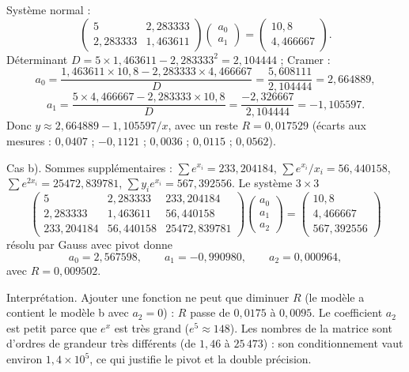  Système normal :
\[
  \begin{pmatrix} 5 & 2{,}283333\\ 2{,}283333 & 1{,}463611 \end{pmatrix}
  \begin{pmatrix} a_0\\ a_1 \end{pmatrix}
  = \begin{pmatrix} 10{,}8\\ 4{,}466667 \end{pmatrix}.
\]
Déterminant $D = 5 \times 1{,}463611 - 2{,}283333^2 = 2{,}104444$ ; Cramer :
\[
  a_0 = \frac{1{,}463611 \times 10{,}8 - 2{,}283333 \times 4{,}466667}{D}
      = \frac{5{,}608111}{2{,}104444} = 2{,}664889,
\]
\[
  a_1 = \frac{5 \times 4{,}466667 - 2{,}283333 \times 10{,}8}{D}
      = \frac{-2{,}326667}{2{,}104444} = -1{,}105597 .
\]
Donc $y \approx 2{,}664889 - 1{,}105597/x$, avec un reste $R = 0{,}017529$
(écarts aux mesures : $0{,}0407$ ; $-0{,}1121$ ; $0{,}0036$ ; $0{,}0115$ ;
$0{,}0562$).

 Cas b). Sommes supplémentaires :
$\sum e^{x_i} = 233{,}204184$, $\sum e^{x_i}/x_i = 56{,}440158$,
$\sum e^{2x_i} = 25472{,}839781$, $\sum y_ie^{x_i} = 567{,}392556$. Le système
$3\times 3$
\[
  \begin{pmatrix}
    5 & 2{,}283333 & 233{,}204184\\
    2{,}283333 & 1{,}463611 & 56{,}440158\\
    233{,}204184 & 56{,}440158 & 25472{,}839781
  \end{pmatrix}
  \begin{pmatrix} a_0\\ a_1\\ a_2 \end{pmatrix}
  = \begin{pmatrix} 10{,}8\\ 4{,}466667\\ 567{,}392556 \end{pmatrix}
\]
résolu par Gauss avec pivot donne
\[
  a_0 = 2{,}567598, \qquad a_1 = -0{,}990980, \qquad a_2 = 0{,}000964,
\]
avec $R = 0{,}009502$.

 Interprétation. Ajouter une fonction ne peut que diminuer $R$ (le
modèle a contient le modèle b avec $a_2 = 0$) : $R$ passe de $0{,}0175$ à
$0{,}0095$. Le coefficient $a_2$ est petit parce que $e^{x}$ est très grand
($e^5 \approx 148$). Les nombres de la matrice sont d'ordres de grandeur très
différents (de $1{,}46$ à $25\,473$) : son conditionnement vaut environ
$1{,}4\times 10^{5}$, ce qui justifie le pivot et la double précision.

